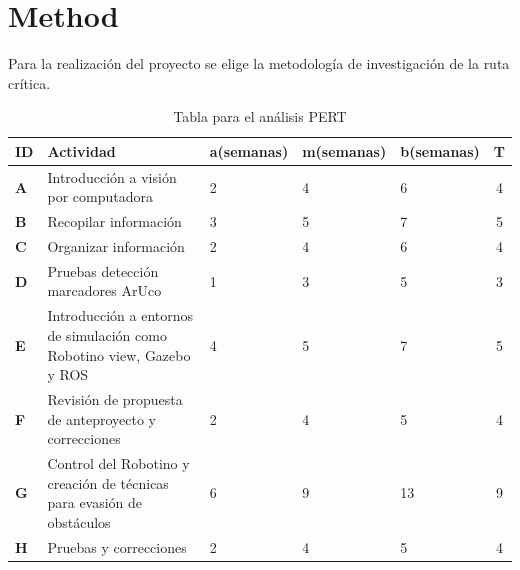 \newpage
\section{Method}

Para la realización del proyecto se elige la metodología de investigación de la ruta crítica.
\begin{table}[h!]
\caption{Tabla para el análisis PERT}
\begin{centering}
\par\end{centering}
\begin{centering}
\begin{tabular}{l>{\raggedright}p{5cm}lllc}
\hline 
\textbf{ID} & \textbf{Actividad} & \textbf{a(semanas)} & \textbf{m(semanas)} & \textbf{b(semanas)} & \textbf{T}\tabularnewline
\hline 
\textbf{A} & Introducción a visión por computadora & 2 & 4 & 6 & 4\tabularnewline
\hline 
\textbf{B} & Recopilar información & 3 & 5 & 7 & 5\tabularnewline
\hline 
\textbf{C} & Organizar información & 2 & 4 & 6 & 4\tabularnewline
\hline 
\textbf{D} & Pruebas detección marcadores ArUco & 1 & 3 & 5 & 3\tabularnewline
\hline 
\textbf{E} & Introducción a entornos de simulación como Robotino view, Gazebo y
ROS & 4 & 5 & 7 & 5\tabularnewline
\hline 
\textbf{F} & Revisión de propuesta de anteproyecto y correcciones & 2 & 4 & 5 & 4\tabularnewline
\hline 
\textbf{G} & Control del Robotino y creación de técnicas para evasión de obstáculos & 6 & 9 & 13 & 9\tabularnewline
\hline 
\textbf{H} & Pruebas y correcciones & 2 & 4 & 5 & 4\tabularnewline
\hline 
\end{tabular}
\par\end{centering}
\centering{}
\end{table}

